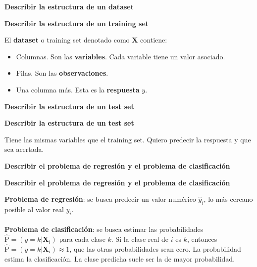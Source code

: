 \documentclass[10pt]{memoir}
\begin{document}
\clearpage
\begin{center}
	\textbf{\Large Describir la estructura de un dataset} \\
\end{center}

\clearpage
\begin{center}
	\textbf{\Large Describir la estructura de un training set} \\
\end{center}
\noindent El \textbf{dataset} o training set denotado como $\mathbf{X}$ contiene: \\
\begin{itemize}
	\item Columnas. Son las \textbf{variables}. Cada variable tiene un valor asociado.
	\item Filas. Son las \textbf{observaciones}.
	\item Una columna más. Esta es la \textbf{respuesta} $y$.
\end{itemize}

\clearpage
\begin{center}
	\textbf{\Large Describir la estructura de un test set} \\
\end{center}

\clearpage
\begin{center}
	\textbf{\Large Describir la estructura de un test set} \\
\end{center}
\noindent Tiene las mismas variables que el training set. Quiero predecir la respuesta y que sea acertada.

\clearpage
\begin{center}
	\textbf{\Large Describir el problema de regresión y el problema de clasificación} \\
\end{center}

\clearpage
\begin{center}
	\textbf{\Large Describir el problema de regresión y el problema de clasificación} \\
\end{center}
\noindent \textbf{Problema de regresión}: se busca predecir un valor numérico \(\hat{y}_{i}\), lo más cercano posible al valor real \(y_{i}\). \\
\\
\textbf{Problema de clasificación}: se busca estimar las probabilidades \(\hat{\text{P}} = (y = k | \mathbf{X}_{i})\) para cada clase $k$. Si la clase real de $i$ es $k$, entonces \(\hat{\text{P}} = (y = k | \mathbf{X}_{i}) \approx 1\), que las otras probabilidades sean cero. La probabilidad estima la clasificación. La clase predicha suele ser la de mayor probabilidad.
\end{document}
